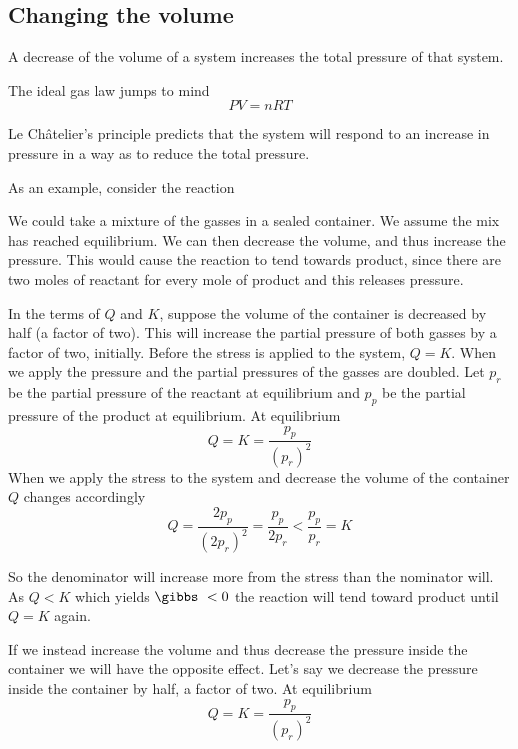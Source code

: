 \documentclass[../mit-general-chemistry.tex]{subfiles}
\begin{document}
\subsection{Changing the volume}


A decrease of the volume of a system increases the total pressure of
that system.

The ideal gas law jumps to mind
\begin{equation}
  PV = nRT
\end{equation}

Le Châtelier's principle predicts that the system will respond to an
increase in pressure in a way as to reduce the total pressure.


As an example, consider the reaction 

We could take a mixture of the gasses in a sealed container. We
assume the mix has reached equilibrium. We can then decrease the
volume, and thus increase the pressure. This would cause the
reaction to tend towards product, since there are two moles of
reactant for every mole of product and this releases pressure.


In the terms of $Q$ and $K$, suppose the volume of the container is
decreased by half (a factor of two). This will increase the partial
pressure of both gasses by a factor of two, initially. Before the
stress is applied to the system, $Q = K$. When we apply the pressure
and the partial pressures of the gasses are doubled. Let $p_r$ be the
partial pressure of the reactant at equilibrium and $p_p$ be the
partial pressure of the product at equilibrium. At equilibrium
\begin{equation*}
  Q = K = \frac{p_p}{(p_r)^2}
\end{equation*}
When we apply the stress to the system and decrease the volume of the
container $Q$ changes accordingly
\begin{equation*}
  Q = \frac{2p_p}{(2p_r)^2} = \frac{p_p}{2p_r} < \frac{p_p}{p_r} = K
\end{equation*}

So the denominator will increase more from the stress than the
nominator will. As $Q < K$ which yields $\gibbs\ < 0$ the reaction will
tend toward product until $Q = K$ again.

If we instead increase the volume and thus decrease the pressure
inside the container we will have the opposite effect. Let's say we
decrease the pressure inside the container by half, a factor of
two. At equilibrium
\begin{equation*}
  Q = K = \frac{p_p}{(p_r)^2}
\end{equation*}
\end{document}
